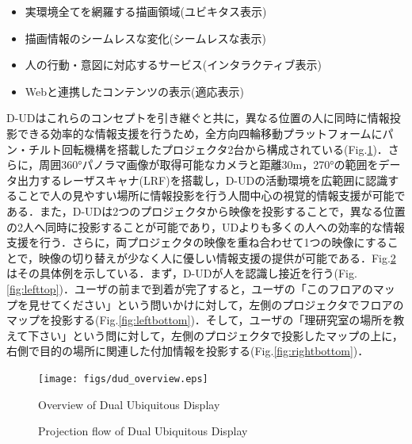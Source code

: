\documentclass[12pt]{sonota/aislab}
\begin{document}
\begin{itemize}
\item 実環境全てを網羅する描画領域(ユビキタス表示)
\item 描画情報のシームレスな変化(シームレスな表示)
\item 人の行動・意図に対応するサービス(インタラクティブ表示)
\item Webと連携したコンテンツの表示(適応表示)
\end{itemize}

D-UDはこれらのコンセプトを引き継ぐと共に，異なる位置の人に同時に情報投影できる効率的な情報支援を行うため，全方向四輪移動プラットフォームにパン・チルト回転機構を搭載したプロジェクタ2台から構成されている(Fig.\ref{DUD})．さらに，周囲360°パノラマ画像が取得可能なカメラと距離30m，270°の範囲をデータ出力するレーザスキャナ(LRF)を搭載し，D-UDの活動環境を広範囲に認識することで人の見やすい場所に情報投影を行う人間中心の視覚的情報支援が可能である．また，D-UDは2つのプロジェクタから映像を投影することで，異なる位置の2人へ同時に投影することが可能であり，UDよりも多くの人への効率的な情報支援を行う．さらに，両プロジェクタの映像を重ね合わせて1つの映像にすることで，映像の切り替えが少なく人に優しい情報支援の提供が可能である．Fig.\ref{fig:twofig}はその具体例を示している．まず，D-UDが人を認識し接近を行う(Fig.\ref{fig:lefttop})．ユーザの前まで到着が完了すると，ユーザの「このフロアのマップを見せてください」という問いかけに対して，左側のプロジェクタでフロアのマップを投影する(Fig.\ref{fig:leftbottom})．そして，ユーザの「理研究室の場所を教えて下さい」という問に対して，左側のプロジェクタで投影したマップの上に，右側で目的の場所に関連した付加情報を投影する(Fig.\ref{fig:rightbottom})．

\begin{figure}[t]
\begin{center}
\texttt{[image: figs/dud\_overview.eps]}
\caption{Overview of Dual Ubiquitous Display}
\label{DUD}
\end{center}
\end{figure}


\begin{figure}[htbp]

	\begin{center}
	\end{center}
	
	\caption{Projection flow of Dual Ubiquitous Display}
	\label{fig:twofig}
\end{figure}
\end{document}
